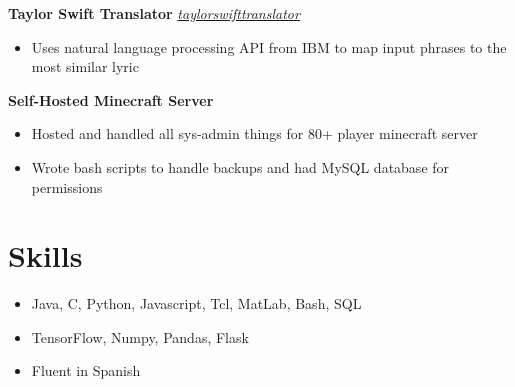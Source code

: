 \documentclass[10pt,letterpaper]{article}
\begin{document}
\textbf{Taylor Swift Translator} \hfill \href{https://github.com/nicolaslindbloomairey/taylorswifttranslator}{ \textit{taylorswifttranslator}}
\begin{itemize}
    \item Uses natural language processing API from IBM to map input phrases to the most similar lyric
\end{itemize}

\textbf{Self-Hosted Minecraft Server}
\begin{itemize}
    \item Hosted and handled all sys-admin things for 80+ player minecraft server
    \item Wrote bash scripts to handle backups and had MySQL database for permissions
\end{itemize}

\section*{Skills} \hrulefill 
\begin{itemize}
    \item Java, C, Python, Javascript, Tcl, MatLab, Bash, SQL
    \item TensorFlow, Numpy, Pandas, Flask
    \item Fluent in Spanish
\end{itemize}
\end{document}
